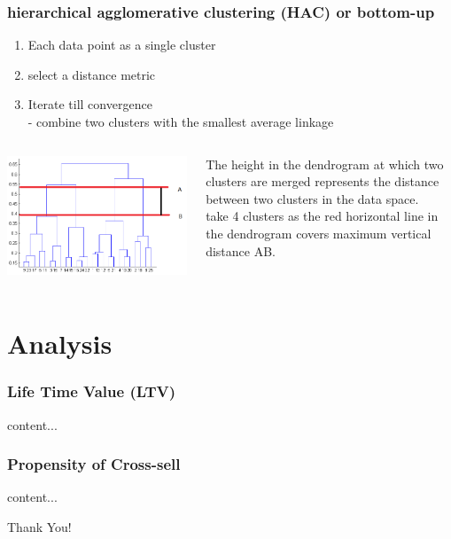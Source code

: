 \documentclass{beamer}
\begin{document}
\begin{frame}\frametitle{hierarchical agglomerative clustering (HAC) or bottom-up}

\begin{enumerate}
	\item Each data point as a single cluster
	\item select a distance metric 
	\item Iterate till convergence\\
	 - combine two clusters with the smallest average linkage
\end{enumerate}



\begin{columns}
	\begin{column}{0.3\textwidth}
		\includegraphics[scale=0.25]{hierarchical}
	\end{column}
	\begin{column}{0.65\textwidth}
		
		The height in the dendrogram at which two clusters are merged represents the distance between two clusters in the data space.\\
		take 4 clusters as the red horizontal line in the dendrogram covers maximum vertical distance AB.\\
		
		
	\end{column}
\end{columns}

\end{frame}

\section{Analysis}

\begin{frame}\frametitle{Life Time Value (LTV)}
	content...
\end{frame}
\begin{frame}\frametitle{Propensity of Cross-sell}
content...
\end{frame}

\begin{frame}
	Thank You!
\end{frame}
\end{document}
